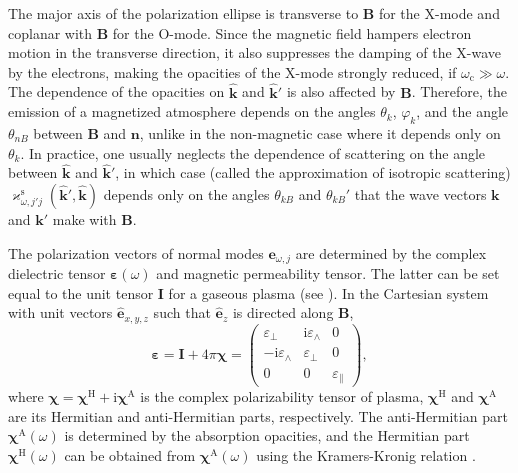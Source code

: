 \documentclass{pos1}
\newcommand{\ChiH}{\bm{\chi}^\mathrm{H}}
\newcommand{\ChiA}{\bm{\chi}^\mathrm{A}}
\newcommand{\khat}{\hat{\mathbf{k}}}
\newcommand{\omc}{\omega_\mathrm{c}}
\newcommand{\opac}{\varkappa}
\begin{document}
The major axis of the polarization ellipse is transverse to
$\bm{B}$ for the X-mode and coplanar with $\bm{B}$ for the
O-mode. Since the magnetic field hampers electron motion in the
transverse direction, it also suppresses 
the damping of the X-wave by the electrons, making
the opacities of the X-mode strongly reduced, if $\omc\gg\omega$.
The dependence of the opacities on $\khat$ and $\khat'$ is also
affected by $\bm{B}$. Therefore, the emission of a magnetized
atmosphere depends on the angles $\theta_k$, $\varphi_k$, and the
angle $\theta_{nB}$ between $\bm{B}$ and 
$\mathbf{n}$, unlike in the non-magnetic case where it depends
only on $\theta_k$. In practice, one usually neglects the dependence
of scattering on the angle between $\khat$ and $\khat'$, in which case
(called the approximation of isotropic scattering) 
$\opac_{\omega,j'j}^\mathrm{s}(\khat',\khat)$ depends only
on the angles $\theta_{kB}$ and $\theta_{kB}'$ that the wave vectors
$\bm{k}$ and $\bm{k}'$ make with $\bm{B}$.

The polarization vectors of normal modes $\bm{e}_{\omega,j}$ are
determined by the complex dielectric tensor $\bm{\varepsilon}(\omega)$
and magnetic permeability tensor. The latter can be set
equal to the unit tensor $\mathbf{I}$ for a gaseous plasma (see
\cite{Ginzburg}). In the Cartesian system with unit vectors
$\hat{\mathbf{e}}_{x,y,z}$ such that $\hat{\mathbf{e}}_{z}$ is
directed along $\bm{B}$,
\begin{equation}
  \bm{\varepsilon} = \mathbf{I} + 4\pi\bm{\chi}
          = 
 \left( \begin{array}{ccc}
 \varepsilon_\perp & \mathrm{i} \varepsilon_\wedge & 0 \\
 -\mathrm{i}\varepsilon_\wedge & \varepsilon_\perp & 0 \\
 0 & 0 & \varepsilon_\| 
 \end{array} \right),
\label{eps-p}
\end{equation}
where
$\bm{\chi}=\ChiH+\mathrm{i}\ChiA$ is the complex polarizability tensor
of plasma, $\ChiH$ and $\ChiA$ are its Hermitian and anti-Hermitian
parts, respectively. The anti-Hermitian part $\ChiA(\omega)$ is
determined by the absorption opacities, and the Hermitian part
$\ChiH(\omega)$ can be obtained from $\ChiA(\omega)$ using the
Kramers-Kronig relation \cite{BulikPavlov,KK}.
\end{document}
